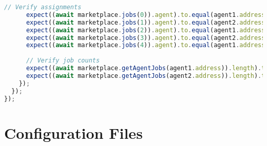 \begin{lstlisting}[language=JavaScript,caption={Complete test suite for smart contracts}]
      // Verify assignments
      expect((await marketplace.jobs(0)).agent).to.equal(agent1.address);
      expect((await marketplace.jobs(1)).agent).to.equal(agent2.address);
      expect((await marketplace.jobs(2)).agent).to.equal(agent1.address);
      expect((await marketplace.jobs(3)).agent).to.equal(agent2.address);
      expect((await marketplace.jobs(4)).agent).to.equal(agent1.address);
      
      // Verify job counts
      expect((await marketplace.getAgentJobs(agent1.address)).length).to.equal(3);
      expect((await marketplace.getAgentJobs(agent2.address)).length).to.equal(2);
    });
  });
});
\end{lstlisting}

\section{Configuration Files}
